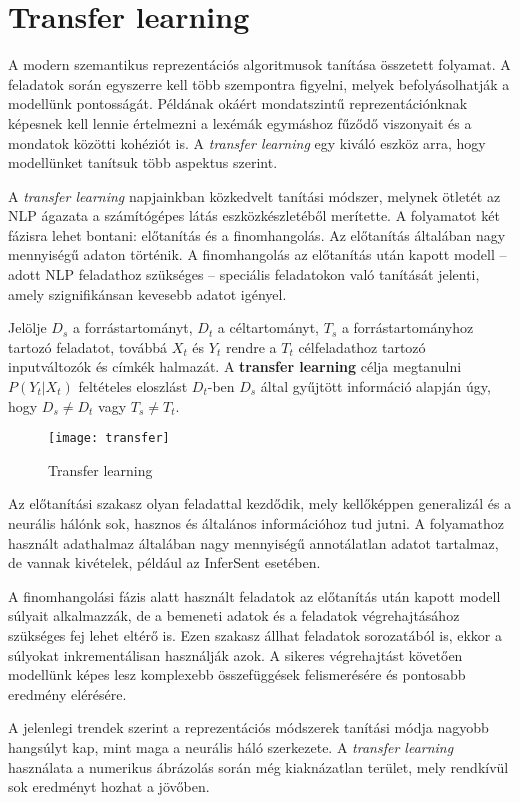\section{Transfer learning}

A modern szemantikus reprezentációs algoritmusok tanítása összetett folyamat. A feladatok során egyszerre kell több szempontra figyelni, melyek befolyásolhatják a modellünk pontosságát. Példának okáért mondatszintű reprezentációnknak képesnek kell lennie értelmezni a lexémák egymáshoz fűződő viszonyait és a mondatok közötti kohéziót is. A \textit{transfer learning} egy kiváló eszköz arra, hogy modellünket tanítsuk több aspektus szerint.

A \textit{transfer learning} napjainkban közkedvelt tanítási módszer, melynek ötletét az NLP ágazata a számítógépes látás eszközkészletéből merítette. A folyamatot két fázisra lehet bontani: előtanítás és a finomhangolás. Az előtanítás általában nagy mennyiségű adaton történik. A finomhangolás az előtanítás után kapott modell – adott NLP feladathoz szükséges – speciális feladatokon való tanítását jelenti, amely szignifikánsan kevesebb adatot igényel.

\begin{definition}
	Jelölje $D_s$ a forrástartományt, $D_t$ a céltartományt, $T_s$ a forrástartományhoz tartozó feladatot, továbbá $X_t$ és $Y_t$ rendre a $T_t$ célfeladathoz tartozó inputváltozók és  címkék halmazát. A \textbf{transfer learning} célja megtanulni $P(Y_t|X_t)$ feltételes eloszlást $D_t$-ben $D_s$ által gyűjtött információ alapján úgy, hogy $D_s \neq D_t$ vagy $T_s \neq T_t$.	 
\end{definition}

\begin{figure}[H]
	\centering
	\texttt{[image: transfer]}
	\caption{Transfer learning}
\end{figure}

Az előtanítási szakasz olyan feladattal kezdődik, mely kellőképpen generalizál és a neurális hálónk sok, hasznos és általános információhoz tud jutni. A folyamathoz használt adathalmaz általában nagy mennyiségű annotálatlan adatot tartalmaz, de vannak kivételek, például az InferSent esetében.

A finomhangolási fázis alatt használt feladatok az előtanítás után kapott modell súlyait alkalmazzák, de a bemeneti adatok és a feladatok végrehajtásához szükséges fej lehet eltérő is. Ezen szakasz állhat feladatok sorozatából is, ekkor a súlyokat inkrementálisan használják azok. A sikeres végrehajtást követően modellünk képes lesz komplexebb összefüggések felismerésére és pontosabb eredmény elérésére.

A jelenlegi trendek szerint a reprezentációs módszerek tanítási módja nagyobb hangsúlyt kap, mint maga a neurális háló szerkezete. A \textit{transfer learning} használata a numerikus ábrázolás során még kiaknázatlan terület, mely rendkívül sok eredményt hozhat a jövőben.







